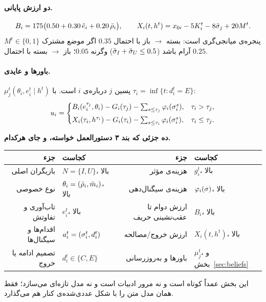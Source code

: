 \documentclass[12pt,a4paper]{article}
\begin{document}
\paragraph{دو ارزش پایانی.}
\[
  B_i=175\bigl(0.50+0.30\,\hat{e}_i+0.20\,\bar{\rho}_i\bigr),\qquad
  X_i(t,h^t)=x_{0i}-5K_i^t-8\tilde{\sigma}_j+20M^t .
\]
$M^t\in\{0,1\}$ پنجره‌ی میانجی‌گری است: بسته $\to$ باز با احتمال $0.35$ اگر
موضع مشترک آرام باشد ($\tilde{\sigma}_I+\tilde{\sigma}_U\le0.5$) وگرنه $0.05$؛ باز
$\to$ بسته با احتمال $0.25$.

\paragraph{باورها و عایدی.}
$\mu_j^t(\theta_i,e_i^t\mid h^t)$ پسین $j$ درباره‌ی $i$ است. با
$\tau_i=\inf\{t:d_i^t=E\}$:
\[
  u_i=
  \begin{cases}
    B_i(e_i^{\tau_j},\theta_i)-G_i(\tau_j)-\sum_{s\le\tau_j}\varphi_i(\sigma_i^s),
      & \tau_i>\tau_j,\\[4pt]
    X_i(\tau_i,h^{\tau_i})-G_i(\tau_i)-\sum_{s\le\tau_i}\varphi_i(\sigma_i^s),
      & \tau_i\le\tau_j .
  \end{cases}
\]

\begin{keybox}
\textbf{ده جزئی که بند ۳ دستورالعمل خواسته، و جای هرکدام.}

\vspace{3pt}
\centering\small
\begin{tabular}{@{}rl@{\qquad}rl@{}}
\toprule
جزء & کجاست & جزء & کجاست\\
\midrule
بازیگران اصلی & $N=\{I,U\}$، بالا & هزینه‌ی مؤثر & $g_i^t$، بالا\\
نوع خصوصی & $\theta_i=(\bar{\rho}_i,\bar{m}_i)$، بالا & هزینه‌ی سیگنال‌دهی & $\varphi_i(\sigma)$، بالا\\
تاب‌آوری و تفاوتش & $e_i^t$، بالا & ارزش دوام تا عقب‌نشینی حریف & $B_i$، بالا\\
اقدام‌ها و سیگنال‌ها & $a_i^t=(\sigma_i^t,d_i^t)$ & ارزش خروج/مصالحه & $X_i(t,h^t)$، بالا\\
تصمیم ادامه یا خروج & $d_i^t\in\{C,E\}$ & باورها و به‌روزرسانی & $\mu_j^t$، و بخش~\ref{sec:beliefs}\\
\bottomrule
\end{tabular}

\vspace{4pt}
\raggedright\small
این بخش عمداً کوتاه است و نه مرور ادبیات است و نه مدل تازه‌ای می‌سازد؛ فقط
همان مدل متن را با شکل عددی‌شده‌ی  کنار هم می‌گذارد.
\end{keybox}
\end{document}
